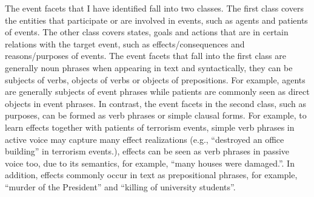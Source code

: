 The event facets that I have 
identified 
fall into two classes. 
The first class covers the 
entities that participate or are involved in events, 
such as agents and patients of events. 
The other class covers 
states, goals and actions that are 
in certain relations with the target event, 
such as effects/consequences and reasons/purposes of events. 
The event facets that fall into the first class are generally noun phrases when appearing in text 
and syntactically, they can 
be subjects of verbs, objects of verbs or objects of prepositions.  
For example, agents are generally subjects of event phrases 
while patients 
are commonly seen as direct objects in event phrases. 
In contrast, the event facets in the second class, such as purposes, 
can be formed as verb phrases  
or simple clausal forms.
For example, to learn effects together with patients of terrorism events, 
simple verb phrases in active voice
may capture many effect realizations (e.g., ``destroyed an office building'' in terrorism events.), 
effects can be seen as verb phrases in passive voice too, due to its semantics, 
for example, ``many houses were damaged.''. 
In addition, effects commonly occur in text as 
prepositional phrases, for example, ``murder of the President'' 
and ``killing of university students''. 


